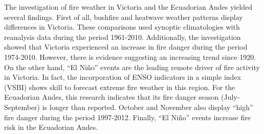 The investigation of fire weather in Victoria and the Ecuadorian Andes
yielded several findings. First of all, bushfire and heatwave weather
patterns display differences in Victoria. These comparisons used synoptic
climatologies with reanalysis data during the period 1961-2010. Additionally,
the investigation showed that Victoria experienced an increase in
fire danger during the period 1974-2010. However, there is evidence
suggesting an increasing trend since 1920. On the other hand, \textquotedblleft El
Ni\~no\textquotedblright{} events are the leading remote driver of fire
activity in Victoria. In fact, the incorporation of ENSO indicators
in a simple index (VSBI) shows skill to forecast extreme fire weather
in this region. For the Ecuadorian Andes, this research indicates
that its fire danger season (July-September) is longer than reported.
October and November also display \textquotedblleft high\textquotedblright{}
fire danger during the period 1997-2012. Finally, \textquotedblleft El
Ni\~no\textquotedblright{} events increase fire risk in the Ecuadorian
Andes. 
